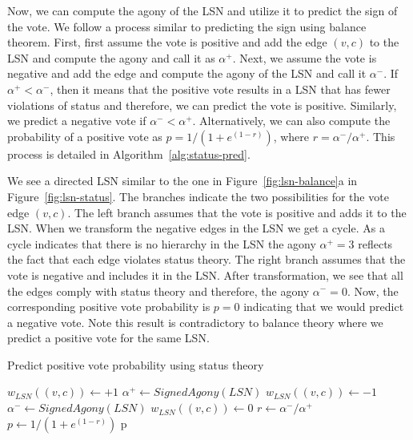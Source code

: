 Now, we can compute the agony of the LSN and utilize it to predict the sign of the vote. We follow a process similar to predicting the sign using balance theorem. First, first assume the vote is positive and add the edge $(v,c)$ to the LSN and compute the agony and call it as $\alpha^+$. Next, we assume the vote is negative and add the edge and compute the agony of the LSN and call it $\alpha^-$. If $\alpha^+ < \alpha^-$, then it means that the positive vote results in a LSN that has fewer violations of status and therefore, we can predict the vote is positive. Similarly, we predict a negative vote if $\alpha^- < \alpha^+$. Alternatively, we can also compute the probability of a positive vote as $p=1/(1+e^{(1-r)})$, where $r=\alpha^-/\alpha^+$. This process is detailed in Algorithm~\ref{alg:status-pred}.

We see a directed LSN similar to the one in Figure~\ref{fig:lsn-balance}a in Figure~\ref{fig:lsn-status}. The branches indicate the two possibilities for the vote edge $(v,c)$. The left branch assumes that the vote is positive and adds it to the LSN. When we transform the negative edges in the LSN we get a cycle. As a cycle indicates that there is no hierarchy in the LSN the agony $\alpha^+=3$ reflects the fact that each edge violates status theory. The right branch assumes that the vote is negative and includes it in the LSN. After transformation, we see that all the edges comply with status theory and therefore, the agony $\alpha^-=0$. Now, the corresponding positive vote probability is $p=0$ indicating that we would predict a negative vote. Note this result is contradictory to balance theory where we predict a positive vote for the same LSN.

\begin{algorithm}[htp]
    \DontPrintSemicolon
    \caption{Predict positive vote probability using status theory}
    \label{alg:status-pred}
    $w_{LSN}((v,c)) \leftarrow +1$ 
    $\alpha^+ \leftarrow SignedAgony(LSN)$\;
    $w_{LSN}((v,c)) \leftarrow -1$  
    $\alpha^- \leftarrow SignedAgony(LSN)$\;
    $w_{LSN}((v,c)) \leftarrow 0$ 
    $r \leftarrow {\alpha^-}/{\alpha^{+}}$\;
    $p \leftarrow 1/(1+e^{(1-r)})$\;
    \Return p
\end{algorithm}




